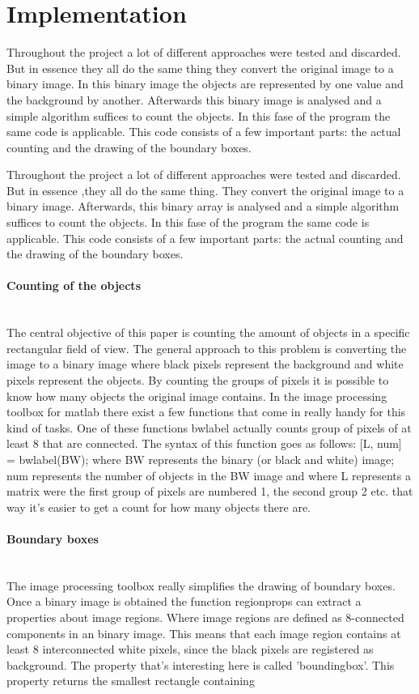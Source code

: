 \documentclass[11pt]{article}
\begin{document}
\section{Implementation}
Throughout the project a lot of different approaches were tested and discarded. But in essence they all do the same thing they convert the original image to a binary image. In this binary image the objects are represented by one value and the background by another. Afterwards this binary image is analysed and a simple algorithm suffices to count the objects. In this fase of the program the same code is applicable. This code consists of a few important parts: the actual counting and the drawing of the boundary boxes. 

Throughout the project a lot of different approaches were tested and discarded. But in essence ,they all do the same thing. They convert the original image to a binary image. Afterwards, this binary array is analysed and a simple algorithm suffices to count the objects. In this fase of the program the same code is applicable. This code consists of a few important parts: the actual counting and the drawing of the boundary boxes. 
\paragraph{Counting of the objects}\mbox{}\\
The central objective of this paper is counting the amount of objects in a specific rectangular field of view. The general approach to this problem is converting the image to a binary image where black pixels represent the background and white pixels represent the objects. By counting the groups of pixels it is possible to know how many objects the original image contains. In the image processing toolbox for matlab there exist a few functions that come in really handy for this kind of tasks. One of these functions bwlabel actually counts group of pixels of at least 8 that are connected. The syntax of this function goes as follows: [L, num] = bwlabel(BW); where BW represents the binary (or black and white) image; num represents the number of objects in the BW image and where L represents a matrix were the first group of pixels are numbered 1, the second group 2 etc. that way it's easier to get a count for how many objects there are.

\paragraph{Boundary boxes}\mbox{}\\
The image processing toolbox really simplifies the drawing of boundary boxes. Once a binary image is obtained the function regionprops can extract a properties about image regions. Where image regions are defined as 8-connected components in an binary image. This means that each image region contains at least 8 interconnected white pixels, since the black pixels are registered as background. The property that's interesting here is called 'boundingbox'. This property returns the smallest rectangle containing
\end{document}
